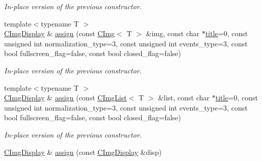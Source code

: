 \begin{DoxyCompactItemize}
\begin{DoxyCompactList}\small\item\em In-\/place version of the previous constructor. \end{DoxyCompactList}\item 
\hypertarget{structcimg__library_1_1_c_img_display_a7d4e16db609faacfebcf1ae5cdb706e7}{{\footnotesize template$<$typename T $>$ }\\\hyperlink{structcimg__library_1_1_c_img_display}{C\-Img\-Display} \& \hyperlink{structcimg__library_1_1_c_img_display_a7d4e16db609faacfebcf1ae5cdb706e7}{assign} (const \hyperlink{structcimg__library_1_1_c_img}{C\-Img}$<$ T $>$ \&img, const char $\ast$\hyperlink{structcimg__library_1_1_c_img_display_afa41a285232ef89035e1832c7dc92ec1}{title}=0, const unsigned int normalization\-\_\-type=3, const unsigned int events\-\_\-type=3, const bool fullscreen\-\_\-flag=false, const bool closed\-\_\-flag=false)}\label{structcimg__library_1_1_c_img_display_a7d4e16db609faacfebcf1ae5cdb706e7}

\begin{DoxyCompactList}\small\item\em In-\/place version of the previous constructor. \end{DoxyCompactList}\item 
\hypertarget{structcimg__library_1_1_c_img_display_a25c7a4679420f5a16e0fcf9e10719b86}{{\footnotesize template$<$typename T $>$ }\\\hyperlink{structcimg__library_1_1_c_img_display}{C\-Img\-Display} \& \hyperlink{structcimg__library_1_1_c_img_display_a25c7a4679420f5a16e0fcf9e10719b86}{assign} (const \hyperlink{structcimg__library_1_1_c_img_list}{C\-Img\-List}$<$ T $>$ \&list, const char $\ast$\hyperlink{structcimg__library_1_1_c_img_display_afa41a285232ef89035e1832c7dc92ec1}{title}=0, const unsigned int normalization\-\_\-type=3, const unsigned int events\-\_\-type=3, const bool fullscreen\-\_\-flag=false, const bool closed\-\_\-flag=false)}\label{structcimg__library_1_1_c_img_display_a25c7a4679420f5a16e0fcf9e10719b86}

\begin{DoxyCompactList}\small\item\em In-\/place version of the previous constructor. \end{DoxyCompactList}\item 
\hypertarget{structcimg__library_1_1_c_img_display_a61aff2566959152ed1f9f36f172d08ed}{\hyperlink{structcimg__library_1_1_c_img_display}{C\-Img\-Display} \& \hyperlink{structcimg__library_1_1_c_img_display_a61aff2566959152ed1f9f36f172d08ed}{assign} (const \hyperlink{structcimg__library_1_1_c_img_display}{C\-Img\-Display} \&disp)}\label{structcimg__library_1_1_c_img_display_a61aff2566959152ed1f9f36f172d08ed}


\end{DoxyCompactItemize}
